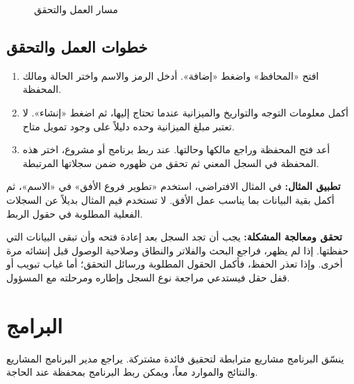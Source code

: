 \begin{figure}[H]
\centering
{}
\rclegend
\caption{مسار العمل والتحقق}
\label{fig:projects-portfolios-flow}
\end{figure}

\subsection{خطوات العمل والتحقق}
\begin{enumerate}
\item افتح «المحافظ» واضغط «إضافة». أدخل الرمز والاسم واختر الحالة ومالك المحفظة.
\item أكمل معلومات التوجه والتواريخ والميزانية عندما تحتاج إليها، ثم اضغط «إنشاء». لا تعتبر مبلغ الميزانية وحده دليلاً على وجود تمويل متاح.
\item أعد فتح المحفظة وراجع مالكها وحالتها. عند ربط برنامج أو مشروع، اختر هذه المحفظة في السجل المعني ثم تحقق من ظهوره ضمن سجلاتها المرتبطة.
\end{enumerate}

\textbf{تطبيق المثال:} في المثال الافتراضي، استخدم «تطوير فروع الأفق» في «الاسم»، ثم أكمل بقية البيانات بما يناسب عمل الأفق. لا تستخدم قيم المثال بديلاً عن السجلات الفعلية المطلوبة في حقول الربط.

\textbf{تحقق ومعالجة المشكلة:} يجب أن تجد السجل بعد إعادة فتحه وأن تبقى البيانات التي حفظتها. إذا لم يظهر، فراجع البحث والفلاتر والنطاق وصلاحية الوصول قبل إنشائه مرة أخرى. وإذا تعذر الحفظ، فأكمل الحقول المطلوبة ورسائل التحقق؛ أما غياب تبويب أو قفل حقل فيستدعي مراجعة نوع السجل وإطاره ومرحلته مع المسؤول.

\clearpage
\section{البرامج}
\label{sec:projects-feature-programs}

ينسّق البرنامج مشاريع مترابطة لتحقيق فائدة مشتركة. يراجع مدير البرنامج المشاريع والنتائج والموارد معاً، ويمكن ربط البرنامج بمحفظة عند الحاجة.

